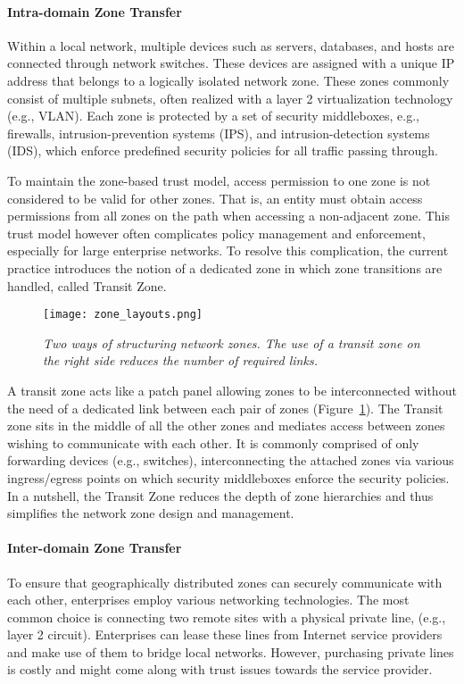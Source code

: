 \paragraph{Intra-domain Zone Transfer}
Within a local network, multiple devices such as servers, databases, and hosts are connected
through network switches. These devices are assigned with a unique IP address that belongs
to a logically isolated network zone. These zones commonly consist of multiple subnets,
often realized with a layer 2 virtualization technology (e.g., VLAN). Each zone is protected
by a set of security middleboxes, e.g., firewalls, intrusion-prevention systems (IPS),
and intrusion-detection systems (IDS), which enforce predefined security policies for all
traffic passing through.

To maintain the zone-based trust model, access permission to one zone is not considered to be
valid for other zones. That is, an entity must obtain access permissions from all zones on the
path when accessing a non-adjacent zone. This trust model however often complicates policy management
and enforcement, especially for large enterprise networks.
To resolve this complication, the current practice introduces the notion of a dedicated zone in which zone
transitions are handled, called Transit Zone.

\begin{figure}[htb]
	\begin{center}
		\texttt{[image: zone\_layouts.png]}
	\end{center}
	\caption{\textit{Two ways of structuring network zones. The use of a transit zone on the right side reduces
	the number of required links.}}
	\label{fig:zone_layout}
\end{figure}

A transit zone acts like a patch panel allowing zones to be interconnected without the need
of a dedicated link between each pair of zones (Figure~\ref{fig:zone_layout}).
The Transit zone sits in the middle of all
the other zones and mediates access between zones wishing to communicate with each other.
It is commonly comprised of only forwarding devices (e.g., switches), interconnecting the
attached zones via various ingress/egress points on which security middleboxes enforce the
security policies. In a nutshell, the Transit Zone reduces the depth of zone hierarchies and
thus simplifies the network zone design and management.

\paragraph{Inter-domain Zone Transfer}
To ensure that geographically distributed zones can securely communicate with each other,
enterprises employ various networking technologies. The most common choice is connecting
two remote sites with a physical private line, (e.g., layer 2 circuit). Enterprises
can lease these lines from Internet service providers and make use of them to bridge local
networks. However, purchasing private lines is costly and might come along
with trust issues towards the service provider.

